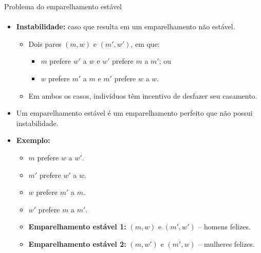 \begin{frame}{Problema do emparelhamento estável}
\framesubtitle{}

	\begin{itemize}
		\item \textbf{Instabilidade:} caso que resulta em um emparelhamento não estável.
		\begin{itemize}
			\item Dois pares $(m, w)$ e $(m', w')$, em que:
			\begin{itemize}
				\item $m$ prefere $w'$ a $w$ e $w'$ prefere $m$ a $m'$; ou
				\item $w$ prefere $m'$ a $m$ e $m'$ prefere $w$ a $w$.
			\end{itemize}
			\item Em ambos os casos, indivíduos têm incentivo de desfazer seu casamento.
		\end{itemize}
	
		\item Um emparelhamento estável é um emparelhamento perfeito que não possui instabilidade.

		\medskip
	
		\pause
	
		\item \textbf{Exemplo:}
		\begin{itemize}
			\item $m$ prefere $w$ a $w'$.
			\item $m'$ prefere $w'$ a $w$.
			\item $w$ prefere $m'$ a $m$.
			\item $w'$ prefere $m$ a $m'$.
			
			\item \textbf{Emparelhamento estável 1:} $(m, w)$ e $(m', w')$ -- homens felizes.
			\item \textbf{Emparelhamento estável 2:} $(m, w')$ e $(m', w)$ -- mulheres felizes.
		\end{itemize}
	\end{itemize}
\end{frame}



